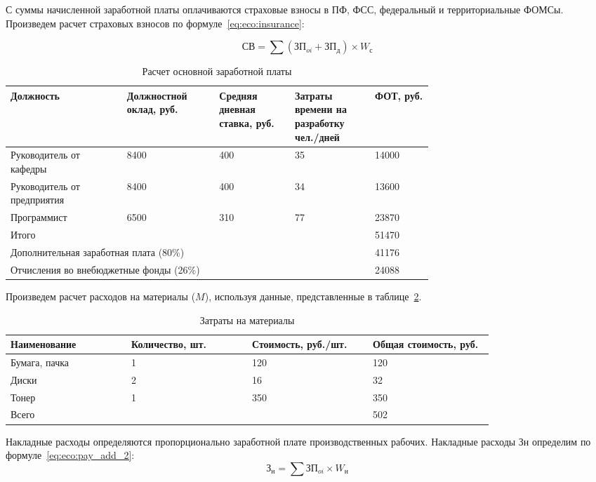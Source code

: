 \documentclass[utf8,usehyperref,12pt]{G7-32}
\begin{document}
С суммы начисленной заработной платы оплачиваются страховые взносы в ПФ, ФСС, федеральный и территориальные ФОМСы. Произведем расчет страховых взносов по формуле~\ref{eq:eco:insurance}:

\begin{equation}
  \label{eq:eco:insurance}
   СВ = \sum (ЗП_{oi} + ЗП_{д}) \times W_с
\end{equation}

\begin{longtable}[c]{|p{0.2\linewidth}|p{0.14\linewidth}|p{0.13\linewidth}|p{0.13\linewidth}|p{0.1\linewidth}|}

\caption{Расчет основной заработной платы \label{T:pay}}\\
\hline Должность & Должностной оклад, руб. & Средняя дневная ставка, руб. & Затраты времени на разработку чел./дней & ФОТ, руб. \\ 
\hline Руководитель от кафедры & 8400 & 400 & 35 & 14000 \\ 
\hline Руководитель от предприятия & 8400 & 400 & 34 & 13600 \\ 
\hline Программист & 6500 & 310 & 77 & 23870 \\ 
\cline{1-5}
\multicolumn{4}{|l|}{Итого} & 51470 \\ 
\cline{1-5}
\multicolumn{4}{|l|}{Дополнительная заработная плата (80\%)} & 41176 \\ 
\cline{1-5}
\multicolumn{4}{|l|}{Отчисления во внебюджетные фонды (26\%)} & 24088 \\ 
\hline 
\end{longtable} 

Произведем расчет расходов на материалы ($M$), используя данные, представленные в таблице~\ref{T:mat}.

\begin{longtable}[c]{|p{0.2\linewidth}|p{0.2\linewidth}|p{0.2\linewidth}|p{0.2\linewidth}|}
\caption{Затраты на материалы \label{T:mat}}\\
\hline Наименование & Количество, шт. & Стоимость, руб./шт. & Общая стоимость, руб. \\ 
\hline Бумага, пачка & 1 & 120 & 120  \\ 
\hline Диски & 2 & 16 & 32  \\ 
\hline Тонер & 1 & 350 &  350 \\ 
\cline{1-4}
\multicolumn{3}{|l|}{Всего} & 502 \\ 
\hline 
\end{longtable} 

Накладные расходы определяются пропорционально заработной плате производственных рабочих.
Накладные расходы Зн определим по формуле~\ref{eq:eco:pay_add_2}:
\begin{equation}
  \label{eq:eco:pay_add_2}
  З_н = \sum ЗП_{oi} \times W_н 
\end{equation}
\end{document}

